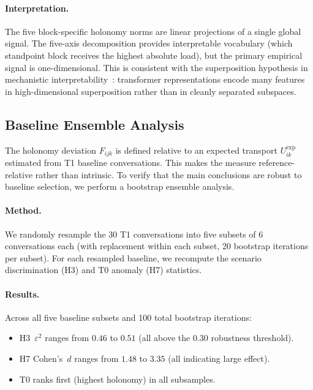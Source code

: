 \paragraph{Interpretation.}
The five block-specific holonomy norms are linear projections of a single global
signal. The five-axis decomposition provides interpretable vocabulary (which
standpoint block receives the highest absolute load), but the primary empirical
signal is one-dimensional. This is consistent with the superposition hypothesis
in mechanistic interpretability~\cite{elhage2022superposition}: transformer
representations encode many features in high-dimensional superposition rather
than in cleanly separated subspaces.

\subsection{Baseline Ensemble Analysis}
\label{app:baseline-ensemble}

The holonomy deviation $F_{ijk}$ is defined relative to an expected transport
$U_{ik}^{\exp}$ estimated from T1 baseline conversations. This makes the measure
reference-relative rather than intrinsic. To verify that the main conclusions are
robust to baseline selection, we perform a bootstrap ensemble analysis.

\paragraph{Method.}
We randomly resample the 30 T1 conversations into five subsets of 6 conversations
each (with replacement within each subset, 20 bootstrap iterations per subset).
For each resampled baseline, we recompute the scenario discrimination (H3) and
T0 anomaly (H7) statistics.

\paragraph{Results.}
Across all five baseline subsets and 100 total bootstrap iterations:
\begin{itemize}
    \item H3~$\varepsilon^2$ ranges from $0.46$ to $0.51$ (all above the $0.30$
    robustness threshold).
    \item H7 Cohen's~$d$ ranges from $1.48$ to $3.35$ (all indicating large effect).
    \item T0 ranks first (highest holonomy) in all subsamples.
\end{itemize}

